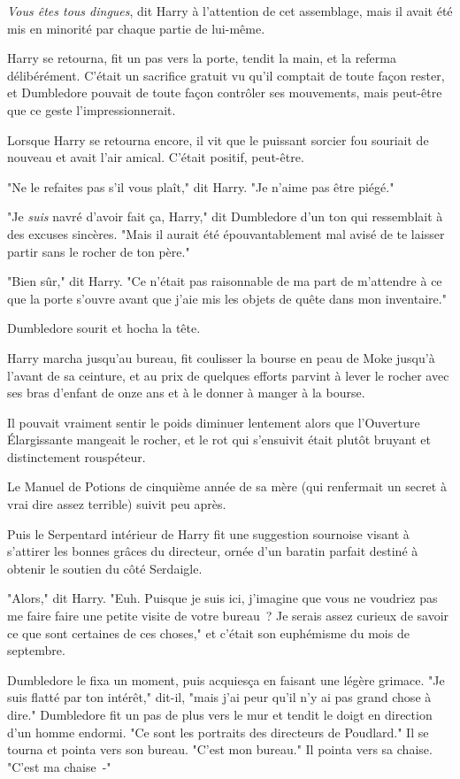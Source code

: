 \emph{Vous êtes tous dingues}, dit Harry à l'attention de cet assemblage, mais il avait été mis en minorité par chaque partie de lui-même.

Harry se retourna, fit un pas vers la porte, tendit la main, et la referma délibérément. C'était un sacrifice gratuit vu qu'il comptait de toute façon rester, et Dumbledore pouvait de toute façon contrôler ses mouvements, mais peut-être que ce geste l'impressionnerait.

Lorsque Harry se retourna encore, il vit que le puissant sorcier fou souriait de nouveau et avait l'air amical. C'était positif, peut-être.

"Ne le refaites pas s'il vous plaît," dit Harry. "Je n'aime pas être piégé."

"Je \emph{suis} navré d'avoir fait ça, Harry," dit Dumbledore d'un ton qui ressemblait à des excuses sincères. "Mais il aurait été épouvantablement mal avisé de te laisser partir sans le rocher de ton père."

"Bien sûr," dit Harry. "Ce n'était pas raisonnable de ma part de m'attendre à ce que la porte s'ouvre avant que j'aie mis les objets de quête dans mon inventaire."

Dumbledore sourit et hocha la tête.

Harry marcha jusqu'au bureau, fit coulisser la bourse en peau de Moke jusqu'à l'avant de sa ceinture, et au prix de quelques efforts parvint à lever le rocher avec ses bras d'enfant de onze ans et à le donner à manger à la bourse.

Il pouvait vraiment sentir le poids diminuer lentement alors que l'Ouverture Élargissante mangeait le rocher, et le rot qui s'ensuivit était plutôt bruyant et distinctement rouspéteur.

Le Manuel de Potions de cinquième année de sa mère (qui renfermait un secret à vrai dire assez terrible) suivit peu après.

Puis le Serpentard intérieur de Harry fit une suggestion sournoise visant à s'attirer les bonnes grâces du directeur, ornée d'un baratin parfait destiné à obtenir le soutien du côté Serdaigle.

"Alors," dit Harry. "Euh. Puisque je suis ici, j'imagine que vous ne voudriez pas me faire faire une petite visite de votre bureau~? Je serais assez curieux de savoir ce que sont certaines de ces choses," et c'était son euphémisme du mois de septembre.

Dumbledore le fixa un moment, puis acquiesça en faisant une légère grimace. "Je suis flatté par ton intérêt," dit-il, "mais j'ai peur qu'il n'y ai pas grand chose à dire." Dumbledore fit un pas de plus vers le mur et tendit le doigt en direction d'un homme endormi. "Ce sont les portraits des directeurs de Poudlard." Il se tourna et pointa vers son bureau. "C'est mon bureau." Il pointa vers sa chaise. "C'est ma chaise~-"

